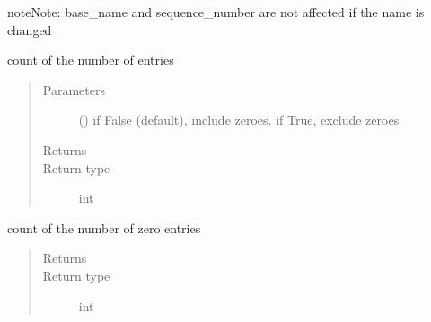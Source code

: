\documentclass[letterpaper,10pt,english]{sphinxmanual}
\begin{document}
\begin{fulllineitems}
\begin{fulllineitems}
\begin{sphinxadmonition}{note}{Note:}
base\_name and sequence\_number are not affected if the name is changed
\end{sphinxadmonition}

\end{fulllineitems}


\begin{fulllineitems}
\label{\detokenize{Reference:salabim.Monitor.number_of_entries}}
count of the number of entries
\begin{quote}\begin{description}
\item[{Parameters}] \leavevmode
{} () \textendash{} if False (default), include zeroes. if True, exclude zeroes

\item[{Returns}] \leavevmode
{}

\item[{Return type}] \leavevmode
int

\end{description}\end{quote}

\end{fulllineitems}


\begin{fulllineitems}
\label{\detokenize{Reference:salabim.Monitor.number_of_entries_zero}}
count of the number of zero entries
\begin{quote}\begin{description}
\item[{Returns}] \leavevmode
{}

\item[{Return type}] \leavevmode
int

\end{description}\end{quote}

\end{fulllineitems}



\end{fulllineitems}
\end{document}
